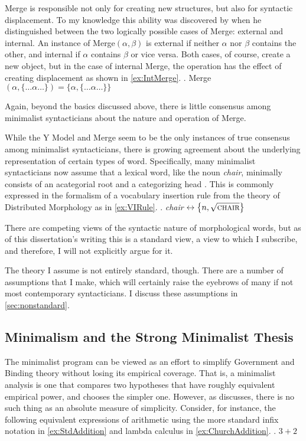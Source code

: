 \documentclass[MilwayThesis]{subfiles}
\begin{document}
Merge is responsible not only for creating new structures, but also for syntactic displacement.
To my knowledge this ability was discovered by \textcite{chomsky2004beyond} when he distinguished between the two logically possible cases of Merge: external and internal.
An instance of Merge$(\alpha, \beta)$ is external if neither $\alpha$ nor $\beta$ contains the other, and internal if $\alpha$ contains $\beta$ or vice versa.
Both cases, of course, create a new object, but in the case of internal Merge, the operation has the effect of creating displacement as shown in \cref{ex:IntMerge}.
\ex.\label{ex:IntMerge} Merge$(\alpha, \{\ldots\alpha\ldots\}) = \{\alpha, \{\ldots\alpha\ldots\}\}$

Again, beyond the basics discussed above, there is little consensus among minimalist syntacticians about the nature and operation of Merge.

While the Y Model and Merge seem to be the only instances of true consensus among minimalist syntacticians, there is growing agreement about the underlying representation of certain types of word.
Specifically, many minimalist syntacticians now assume that a lexical word, like the noun \textit{chair}, minimally consists of an acategorial root and a categorizing head \parencite{borer2005name,marantz1997no}.
This is commonly expressed in the formalism of a vocabulary insertion rule from the theory of Distributed Morphology as in \cref{ex:VIRule}.
\ex.\label{ex:VIRule} \textit{chair} $\leftrightarrow \left\{ n, \sqrt{\textsc{chair}} \right\}$

There are competing views of the syntactic nature of morphological words, but as of this dissertation's writing this is a standard view, a view to which I subscribe, and therefore, I will not explicitly argue for it.

The theory I assume is not entirely standard, though.
There are a number of assumptions that I make, which will certainly raise the eyebrows of many if not most contemporary syntacticians.
I discuss these assumptions in \cref{sec:nonstandard}.

\subsection{Minimalism and the Strong Minimalist Thesis}
The minimalist program can be viewed as an effort to simplify Government and Binding theory without losing its empirical coverage.
That is, a minimalist analysis is one that compares two hypotheses that have roughly equivalent empirical power, and chooses the simpler one.
However, as \textcite{chomsky1965aspects} discusses, there is no such thing as an absolute measure of simplicity.
Consider, for instance, the following equivalent expressions of arithmetic using the more standard infix notation in \cref{ex:StdAddition} and lambda calculus in \cref{ex:ChurchAddition}.
\ex.\label{ex:StdAddition} $3 + 2$
\end{document}
